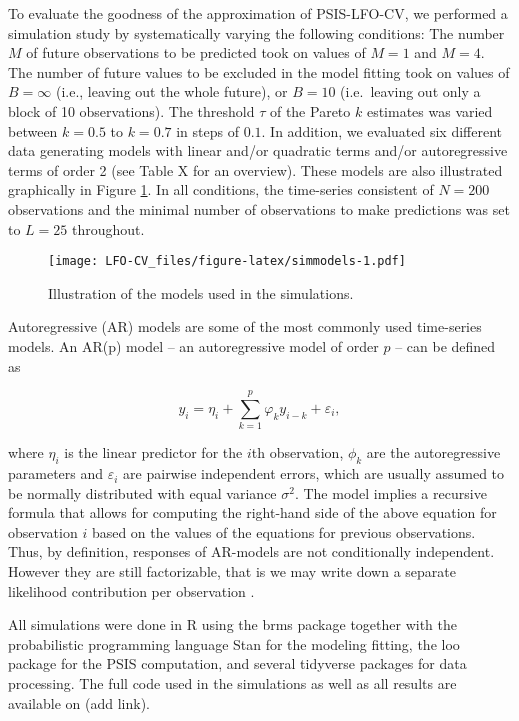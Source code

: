 \documentclass[american,]{article}
\begin{document}
To evaluate the goodness of the approximation of PSIS-LFO-CV,
we performed a simulation study by systematically varying the following
conditions: The number \(M\) of future observations to be predicted took on
values of \(M = 1\) and \(M = 4\). The number of future values to be excluded in the model
fitting took on values of \(B = \infty\) (i.e., leaving out the whole future), or
\(B = 10\) (i.e.~leaving out only a block of 10 observations).
The threshold \(\tau\) of the Pareto \(k\) estimates was varied between
\(k = 0.5\) to \(k = 0.7\) in steps of \(0.1\). In addition, we evaluated six
different data generating models with linear and/or quadratic terms and/or
autoregressive terms of order 2 (see Table X for an overview). These models are
also illustrated graphically in Figure \ref{fig:simmodels}. In all conditions,
the time-series consistent of \(N = 200\) observations and the minimal number
of observations to make predictions was set to \(L = 25\) throughout.

\begin{figure}
\centering
\texttt{[image: LFO-CV\_files/figure-latex/simmodels-1.pdf]}
\caption{\label{fig:simmodels}Illustration of the models used in the simulations.}
\end{figure}

Autoregressive (AR) models are some of the most commonly used time-series models.
An AR(p) model -- an autoregressive model of order \(p\) -- can be defined as

\begin{equation}
y_i = \eta_i + \sum_{k = 1}^p \varphi_k y_{i - k} + \varepsilon_i,
\end{equation}

where \(\eta_i\) is the linear predictor for the \(i\)th observation, \(\phi_k\) are
the autoregressive parameters and \(\varepsilon_i\) are pairwise independent
errors, which are usually assumed to be normally distributed with equal variance
\(\sigma^2\). The model implies a recursive formula that allows for computing the
right-hand side of the above equation for observation \(i\) based on the values of
the equations for previous observations. Thus, by definition, responses of
AR-models are not conditionally independent. However they are still
factorizable, that is we may write down a separate likelihood contribution per
observation \citep[see][ for more discussion on
factorizability of statistical models]{buerkner:non-factorizable}.

All simulations were done in R \citep{R2018} using the brms package \citep{brms1, brms2} together with the probabilistic programming language Stan
\citep{carpenter2017} for the modeling fitting, the loo package \citep{vehtari2017loo} for
the PSIS computation, and several tidyverse packages \citep{tidyverse} for data
processing. The full code used in the simulations as well as all results are
available on (add link).
\end{document}
